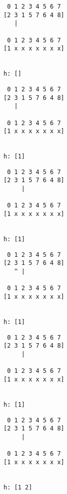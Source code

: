 { \begin{verbatim}
                    0 1 2 3 4 5 6 7
                   [2 3 1 5 7 6 4 8]
                      |

                    0 1 2 3 4 5 6 7
                   [1 x x x x x x x]


                   h: []
\end{verbatim} }

{ \begin{verbatim}
                    0 1 2 3 4 5 6 7
                   [2 3 1 5 7 6 4 8]
                      |

                    0 1 2 3 4 5 6 7
                   [1 x x x x x x x]


                   h: [1]
\end{verbatim} }

{ \begin{verbatim}
                    0 1 2 3 4 5 6 7
                   [2 3 1 5 7 6 4 8]
                        |

                    0 1 2 3 4 5 6 7
                   [1 x x x x x x x]


                   h: [1]
\end{verbatim} }

{ \begin{verbatim}
                    0 1 2 3 4 5 6 7
                   [2 3 1 5 7 6 4 8]
                      ^ |

                    0 1 2 3 4 5 6 7
                   [1 x x x x x x x]


                   h: [1]
\end{verbatim} }

{ \begin{verbatim}
                    0 1 2 3 4 5 6 7
                   [2 3 1 5 7 6 4 8]
                        |

                    0 1 2 3 4 5 6 7
                   [1 x x x x x x x]


                   h: [1]
\end{verbatim} }

{ \begin{verbatim}
                    0 1 2 3 4 5 6 7
                   [2 3 1 5 7 6 4 8]
                        |

                    0 1 2 3 4 5 6 7
                   [1 x x x x x x x]


                   h: [1 2]
\end{verbatim} }

